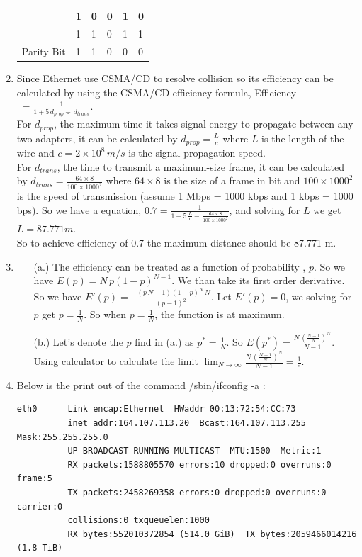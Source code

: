 \documentclass[12pt]{article}
\begin{document}
\begin{singlespace}
\begin{enumerate}
\begin{table}[h]
\begin{tabular}{|l|l|l|l|l|l|}
	           & 1 & 0 & 0 & 1 & 0          \\ \hline
	           & 1 & 1 & 0 & 1 & 1          \\ \hline
	Parity Bit & 1 & 1 & 0 & 0 & 0          \\ \hline
	\end{tabular}
	\end{table}
\item Since Ethernet use CSMA/CD to resolve collision so its efficiency can be calculated by using the CSMA/CD efficiency formula, Efficiency$\; = \frac{1}{1 + 5\,d_{prop} \div \,d_{trans}}$.\\
For $d_{prop}$, the maximum time it takes signal energy to propagate between any two adapters, it can be calculated by $d_{prop} = \frac{L}{c}$ where $L$ is the length of the wire and $c=2\times10^8 \, m/s$ is the signal propagation speed. \\
For $d_{trans}$, the time to transmit a maximum-size frame, it can be calculated by $d_{trans} = \frac{64 \times 8}{100\times1000^2}$ where $64 \times 8$ is the size of a frame in bit and $100\times1000^2$ is the speed of transmission (assume 1 Mbps = 1000 kbps and 1 kbps = 1000 bps). 
So we have a equation, $0.7 = \frac{1}{1 + 5\,\frac{L}{c} \div \, \frac{64 \times 8}{100\times1000^2}}$, and solving for $L$ we get $L = 87.771 m$.\\
So to achieve efficiency of 0.7 the maximum distance should be 87.771 m.
\item
\begin{itemize}
	\item[(a.)]
	The efficiency can be treated as a function of probability , $p$. So we have $E(p) = N\,p(1-p)^{N-1}$. We than take its first order derivative. So we have $E'(p) = \frac{-(p\,N-1)(1-p)^N\,N}{(p-1)^2}$. Let $E'(p) = 0$, we solving for $p$ get $p=\frac{1}{N}$. So when $p=\frac{1}{N}$, the function is at maximum.
	\item[(b.)]
	Let's denote the $p$ find in (a.) as $p^* = \frac{1}{N}$. So $E(p^*) = \frac{N \, (\frac{N-1}{N})^N}{N-1}$. Using calculator to calculate the limit $\lim_{N \to \infty} \frac{N \, (\frac{N-1}{N})^N}{N-1} = \frac{1}{e}$.
\end{itemize}

\item
	Below is the print out of the command /sbin/ifconfig -a :
	\begin{lstlisting}[basicstyle=\ttfamily\scriptsize]
% /sbin/ifconfig -a
eth0      Link encap:Ethernet  HWaddr 00:13:72:54:CC:73  
          inet addr:164.107.113.20  Bcast:164.107.113.255  Mask:255.255.255.0
          UP BROADCAST RUNNING MULTICAST  MTU:1500  Metric:1
          RX packets:1588805570 errors:10 dropped:0 overruns:0 frame:5
          TX packets:2458269358 errors:0 dropped:0 overruns:0 carrier:0
          collisions:0 txqueuelen:1000 
          RX bytes:552010372854 (514.0 GiB)  TX bytes:2059466014216 (1.8 TiB)


\end{lstlisting}
\end{enumerate}
\end{singlespace}
\end{document}
